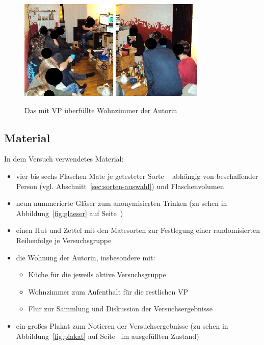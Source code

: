 \documentclass[11pt,a4paper,ngerman]{article}
\begin{document}
\begin{figure}[ht]
 \centering
 \caption{Das mit VP überfüllte Wohnzimmer der Autorin}
 \includegraphics{./Fotos/Wohnung1.jpg}
 \includegraphics{./Fotos/Wohnung2.jpg}
 \label{fig:wohnung}
\end{figure}

\subsection{Material}
In dem Versuch verwendetes Material: 
\begin{itemize}
 \item vier bis sechs Flaschen Mate je getesteter Sorte  -- abhängig von beschaffender Person (vgl. Abschnitt~\ref{sec:sorten-auswahl}) und Flaschenvolumen                                                                                                                                                                                                                                                                                                                                                                                                   
 \item neun nummerierte Gläser zum anonymisierten Trinken (zu sehen in Abbildung~\ref{fig:glaeser} auf Seite~\pageref{fig:glaeser}) %
 \item einen Hut und Zettel mit den Matesorten zur Festlegung einer randomisierten Reihenfolge je Versuchsgruppe
 \item die Wohnung der Autorin, insbesondere mit:
  \begin{itemize}
    \item Küche für die jeweils aktive Versuchsgruppe
    \item Wohnzimmer zum Aufenthalt für die restlichen VP
    \item Flur zur Sammlung und Diskussion der Versuchsergebnisse
  \end{itemize}
 \item ein großes Plakat zum Notieren der Versuchsergebnisse (zu sehen in Abbildung~\ref{fig:plakat} auf Seite~\pageref{fig:plakat} im ausgefüllten Zustand)
\end{itemize}
\end{document}
